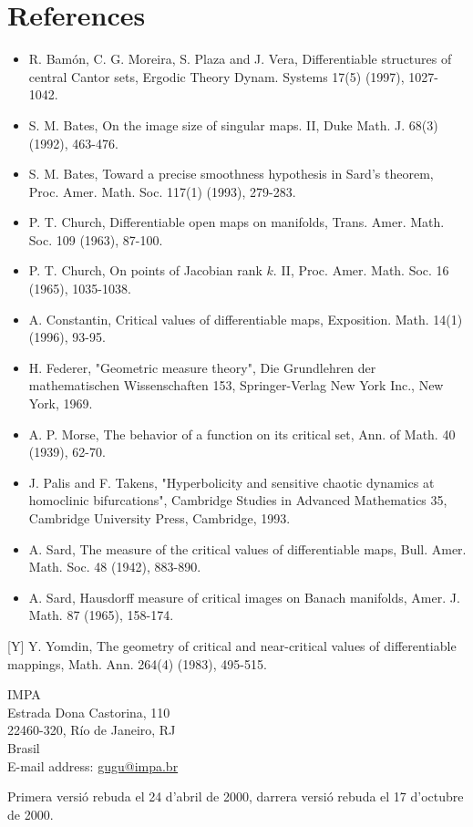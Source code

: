 \documentclass[10pt]{article}
\begin{document}
\section*{References}
\begin{itemize}
  \item[] [BMPV] R. Bamón, C. G. Moreira, S. Plaza and J. Vera, Differentiable structures of central Cantor sets, Ergodic Theory Dynam. Systems 17(5) (1997), 1027-1042.
  \item[] [B1] S. M. Bates, On the image size of singular maps. II, Duke Math. J. 68(3) (1992), 463-476.
  \item[] [B2] S. M. Bates, Toward a precise smoothness hypothesis in Sard's theorem, Proc. Amer. Math. Soc. 117(1) (1993), 279-283.
  \item[] [Ch1] P. T. Church, Differentiable open maps on manifolds, Trans. Amer. Math. Soc. 109 (1963), 87-100.
  \item[] [Ch2] P. T. Church, On points of Jacobian rank $k$. II, Proc. Amer. Math. Soc. 16 (1965), 1035-1038.
  \item[] [Co] A. Constantin, Critical values of differentiable maps, Exposition. Math. 14(1) (1996), 93-95.
  \item[] [F] H. Federer, "Geometric measure theory", Die Grundlehren der mathematischen Wissenschaften 153, Springer-Verlag New York Inc., New York, 1969.
  \item[] [M] A. P. Morse, The behavior of a function on its critical set, Ann. of Math. 40 (1939), 62-70.
  \item[] [PT] J. Palis and F. Takens, "Hyperbolicity and sensitive chaotic dynamics at homoclinic bifurcations", Cambridge Studies in Advanced Mathematics 35, Cambridge University Press, Cambridge, 1993.
  \item[] [S1] A. Sard, The measure of the critical values of differentiable maps, Bull. Amer. Math. Soc. 48 (1942), 883-890.
  \item[] [S2] A. Sard, Hausdorff measure of critical images on Banach manifolds, Amer. J. Math. 87 (1965), 158-174.
\end{itemize}

[Y] Y. Yomdin, The geometry of critical and near-critical values of differentiable mappings, Math. Ann. 264(4) (1983), 495-515.

IMPA\\
Estrada Dona Castorina, 110\\
22460-320, Río de Janeiro, RJ\\
Brasil\\
E-mail address: \href{mailto:gugu@impa.br}{gugu@impa.br}

Primera versió rebuda el 24 d'abril de 2000, darrera versió rebuda el 17 d'octubre de 2000.
\end{document}
